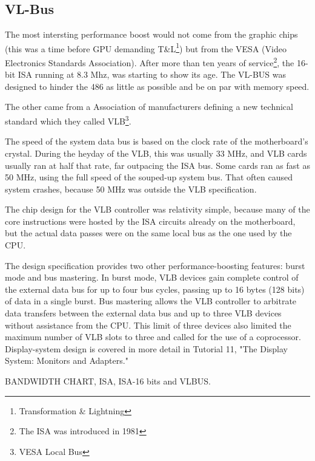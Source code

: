 \subsection{VL-Bus}
The most intersting performance boost would not come from the graphic chips (this was a time before GPU demanding T\&L\footnote{Transformation \& Lightning}) but from the VESA (Video Electronics Standards Association). After more than ten years of service\footnote{The ISA was introduced in 1981}, the 16-bit ISA running at 8.3 Mhz, was starting to show its age. The VL-BUS was designed to hinder the 486 as little as possible and be on par with memory speed.
\par
{}
The other came from a Association of manufacturers defining a new technical standard which they called VLB\footnote{VESA Local Bus}.\\ 
\par
The speed of the system data bus is based on the clock rate of the motherboard's crystal. During the heyday of the VLB, this was usually 33 MHz, and VLB cards usually ran at half that rate, far outpacing the ISA bus. Some cards ran as fast as 50 MHz, using the full speed of the souped-up system bus. That often caused system crashes, because 50 MHz was outside the VLB specification.\\
\par
The chip design for the VLB controller was relativity simple, because many of the core instructions were hosted by the ISA circuits already on the motherboard, but the actual data passes were on the same local bus as the one used by the CPU.\\
\par
The design specification provides two other performance-boosting features: burst mode and bus mastering. In burst mode, VLB devices gain complete control of the external data bus for up to four bus cycles, passing up to 16 bytes (128 bits) of data in a single burst. Bus mastering allows the VLB controller to arbitrate data transfers between the external data bus and up to three VLB devices without assistance from the CPU. This limit of three devices also limited the maximum number of VLB slots to three and called for the use of a coprocessor. Display-system design is covered in more detail in Tutorial 11, "The Display System: Monitors and Adapters."\\
\par

BANDWIDTH CHART, ISA, ISA-16 bits and VLBUS.